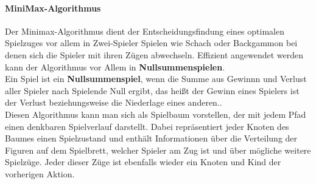 \paragraph{MiniMax-Algorithmus}
Der Minimax-Algorithmus dient der Entscheidungsfindung eines optimalen Spielzuges vor allem in Zwei-Spieler Spielen wie Schach oder Backgammon bei denen sich die Spieler mit ihren Zügen abwechseln. Effizient angewendet werden kann der Algorithmus vor Allem in \textbf{Nullsummenspielen}.\\
Ein Spiel ist ein \textbf{Nullsummenspiel}, wenn die Summe aus Gewinnn und Verlust aller Spieler nach Spielende Null ergibt, das heißt der Gewinn eines Spielers ist der Verlust beziehungsweise die Niederlage eines anderen.\cite{AlphaBeta}.\\
Diesen Algorithmus kann man sich als Spielbaum vorstellen, der mit jedem Pfad einen denkbaren Spielverlauf darstellt. Dabei repräsentiert jeder Knoten des Baumes einen Spielzustand und enthält Informationen über die Verteilung der Figuren auf dem Spielbrett, welcher Spieler am Zug ist und über mögliche weitere Spielzüge. Jeder dieser Züge ist ebenfalls wieder ein Knoten und Kind der vorherigen Aktion.

